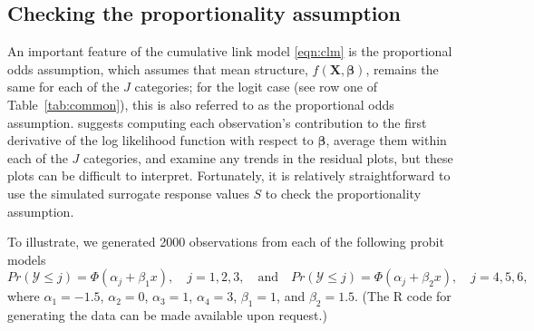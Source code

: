 \subsection{Checking the proportionality assumption}

An important feature of the cumulative link model \eqref{eqn:clm} is the proportional odds assumption, which assumes that mean structure, $f\left(\boldsymbol{X}, \boldsymbol{\beta}\right)$, remains the same for each of the $J$ categories; for the logit case (see row one of Table~\ref{tab:common}), this is also referred to as the proportional odds assumption. \citet[pp. 334--335]{regression-harrell-2001} suggests computing each observation's contribution to the first derivative of the log likelihood function with respect to $\boldsymbol{\beta}$, average them within each of the $J$ categories, and examine any trends in the residual plots, but these plots can be difficult to interpret. Fortunately, it is relatively straightforward to use the simulated surrogate response values $S$ to check the proportionality assumption.

To illustrate, we generated 2000 observations from each of the following probit models
\begin{equation*}
  Pr\left(\mathcal{Y} \le j\right) = \Phi\left(\alpha_j + \beta_1 x\right), \quad j = 1, 2, 3, \quad \textrm{and} \quad Pr\left(\mathcal{Y} \le j\right) = \Phi\left(\alpha_j + \beta_2 x\right), \quad j = 4, 5, 6,
\end{equation*}
where $\alpha_1 = -1.5$, $\alpha_2 = 0$, $\alpha_3 = 1$, $\alpha_4 = 3$, $\beta_1 = 1$, and $\beta_2 = 1.5$. (The R code for generating the data can be made available upon request.) 

